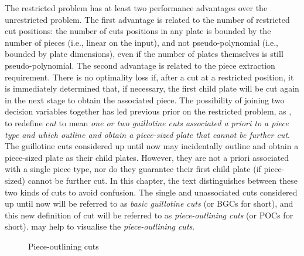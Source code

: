 \documentclass[ppgc,tese,english,formais,babel]{iiufrgs}
\begin{document}
The restricted problem has at least two performance advantages over the unrestricted problem.
The first advantage is related to the number of restricted cut positions: the number of cuts positions in any plate is bounded by the number of pieces (i.e., linear on the input), and not pseudo-polynomial (i.e., bounded by plate dimensions), even if the number of plates themselves is still pseudo-polynomial.
The second advantage is related to the piece extraction requirement.
There is no optimality loss if, after a cut at a restricted position, it is immediately determined that, if necessary, the first child plate will be cut again in the next stage to obtain the associated piece.
The possibility of joining two decision variables together has led previous prior on the restricted problem, as \citet{silva:2010}, to redefine \emph{cut} to mean \emph{one or two guillotine cuts associated a priori to a piece type and which outline and obtain a piece-sized plate that cannot be further cut}.
The guillotine cuts considered up until now may incidentally outline and obtain a piece-sized plate as their child plates.
However, they are not a priori associated with a single piece type, nor do they guarantee their first child plate (if piece-sized) cannot be further cut.
In this chapter, the text distinguishes between these two kinds of cuts to avoid confusion.
The single and unassociated cuts considered up until now will be referred to as \emph{basic guillotine cuts} (or BGCs for short), and this new definition of cut will be referred to as \emph{piece-outlining cuts} (or POCs for short).
 may help to visualise the \emph{piece-outlining cuts}.

\begin{figure}[h]
  \caption{Piece-outlining cuts}
  \center
  
  \label{fig:piece_outlining_cut}
\end{figure}
\end{document}
